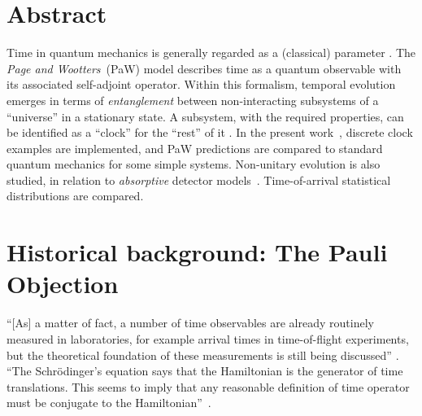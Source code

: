 \documentclass[a0,portrait]{a0poster}
\begin{document}
\begin{multicols}{2} %


\color{Navy} %

\section*{Abstract}
{Time} in quantum mechanics is generally regarded as a (classical) parameter \cite{TQM1, TQM2}.
%
The \emph{Page and Wootters}~(PaW) model
describes time as a quantum observable with its associated self-adjoint operator.
%
Within this formalism, temporal {evolution} {emerges} in terms of \emph{entanglement} between non-interacting subsystems
of a “universe” in a stationary state.
%
A subsystem, with the required properties,  can be identified as a “clock” for the “rest”
of it \cite{Lloyd:Time}.
%
In the present work~\cite{DeRosaMSc}, {discrete} clock examples are implemented,
and PaW predictions are compared to
standard quantum mechanics for some simple systems.
%
Non-unitary evolution is also studied, in relation to \emph{absorptive} detector models~\cite{RuschhauptAbsorption}.
Time-of-arrival statistical distributions are compared.

\setlength{\parindent}{2em} %


\color{SaddleBrown} %


\section*{Historical background: The Pauli Objection}

``[As] a matter of fact, a number of time observables are already routinely measured in
laboratories, for example arrival times in time-of-flight experiments, but the theoretical foundation
of these measurements is still being discussed'' \cite{TQM1}.
%
``The Schr\"odinger's equation says that the Hamiltonian is the generator of time translations. This seems
to imply that any reasonable definition of time operator must be conjugate to the Hamiltonian''~\cite{Maccone:Pauli}.


\end{multicols}
\end{document}
